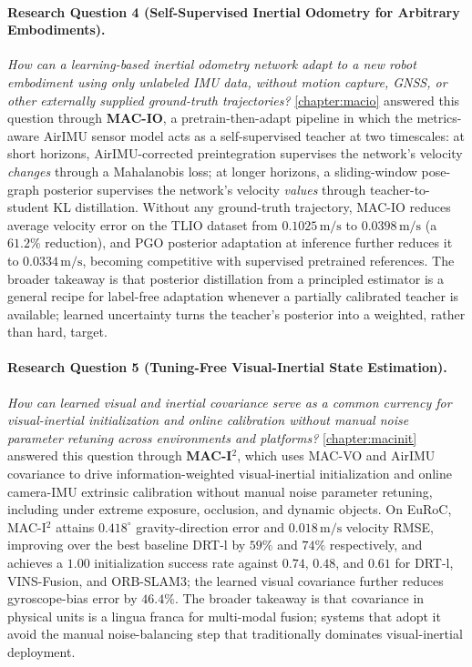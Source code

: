 \paragraph{Research Question 4 (Self-Supervised Inertial Odometry for Arbitrary Embodiments).}
\textit{How can a learning-based inertial odometry network adapt to a new robot embodiment using only unlabeled IMU data, without motion capture, GNSS, or other externally supplied ground-truth trajectories?}
\cref{chapter:macio} answered this question through \textbf{MAC-IO}, a pretrain-then-adapt pipeline in which the metrics-aware AirIMU sensor model acts as a self-supervised teacher at two timescales: at short horizons, AirIMU-corrected preintegration supervises the network's velocity \emph{changes} through a Mahalanobis loss; at longer horizons, a sliding-window pose-graph posterior supervises the network's velocity \emph{values} through teacher-to-student KL distillation.
Without any ground-truth trajectory, MAC-IO reduces average velocity error on the TLIO dataset from $0.1025\,\mathrm{m/s}$ to $0.0398\,\mathrm{m/s}$ (a $61.2\%$ reduction), and PGO posterior adaptation at inference further reduces it to $0.0334\,\mathrm{m/s}$, becoming competitive with supervised pretrained references.
The broader takeaway is that posterior distillation from a principled estimator is a general recipe for label-free adaptation whenever a partially calibrated teacher is available; learned uncertainty turns the teacher's posterior into a weighted, rather than hard, target.

\paragraph{Research Question 5 (Tuning-Free Visual-Inertial State Estimation).}
\textit{How can learned visual and inertial covariance serve as a common currency for visual-inertial initialization and online calibration without manual noise parameter retuning across environments and platforms?}
\cref{chapter:macinit} answered this question through \textbf{MAC-I$^2$}, which uses MAC-VO and AirIMU covariance to drive information-weighted visual-inertial initialization and online camera-IMU extrinsic calibration without manual noise parameter retuning, including under extreme exposure, occlusion, and dynamic objects.
On EuRoC, MAC-I$^2$ attains $0.418^{\circ}$ gravity-direction error and $0.018\,\mathrm{m/s}$ velocity RMSE, improving over the best baseline DRT-l by $59\%$ and $74\%$ respectively, and achieves a $1.00$ initialization success rate against $0.74$, $0.48$, and $0.61$ for DRT-l, VINS-Fusion, and ORB-SLAM3; the learned visual covariance further reduces gyroscope-bias error by $46.4\%$.
The broader takeaway is that covariance in physical units is a lingua franca for multi-modal fusion; systems that adopt it avoid the manual noise-balancing step that traditionally dominates visual-inertial deployment.

